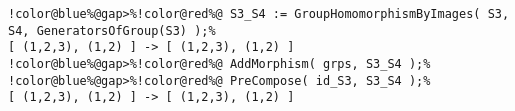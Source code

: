 \begin{Verbatim}[commandchars=!@\%,frame=single]
!color@blue%@gap>%!color@red%@ S3_S4 := GroupHomomorphismByImages( S3, S4, GeneratorsOfGroup(S3) );%
[ (1,2,3), (1,2) ] -> [ (1,2,3), (1,2) ]
!color@blue%@gap>%!color@red%@ AddMorphism( grps, S3_S4 );%
!color@blue%@gap>%!color@red%@ PreCompose( id_S3, S3_S4 );%
[ (1,2,3), (1,2) ] -> [ (1,2,3), (1,2) ]
\end{Verbatim}
